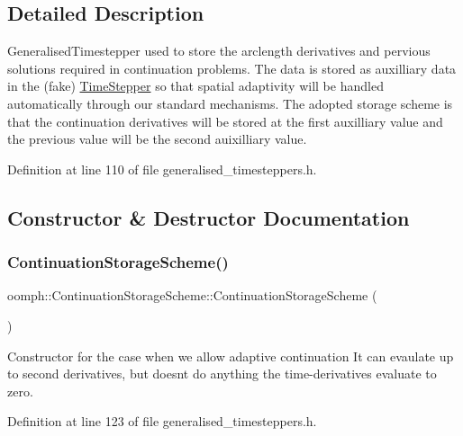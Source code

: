 \subsection{Detailed Description}
Generalised\+Timestepper used to store the arclength derivatives and pervious solutions required in continuation problems. The data is stored as auxilliary data in the (fake) \hyperlink{classoomph_1_1TimeStepper}{Time\+Stepper} so that spatial adaptivity will be handled automatically through our standard mechanisms. The adopted storage scheme is that the continuation derivatives will be stored at the first auxilliary value and the previous value will be the second auixilliary value. 

Definition at line 110 of file generalised\+\_\+timesteppers.\+h.



\subsection{Constructor \& Destructor Documentation}
\mbox{\label{classoomph_1_1ContinuationStorageScheme_afc4105a9e848ef6ea1320611d9d65c9b}} 
\subsubsection{\texorpdfstring{Continuation\+Storage\+Scheme()}{ContinuationStorageScheme()}\hspace{0.1cm}{\footnotesize\ttfamily [1/2]}}
{\footnotesize\ttfamily oomph\+::\+Continuation\+Storage\+Scheme\+::\+Continuation\+Storage\+Scheme (\begin{DoxyParamCaption}{ }\end{DoxyParamCaption})\hspace{0.3cm}{\ttfamily [inline]}}

Constructor for the case when we allow adaptive continuation It can evaulate up to second derivatives, but doesn\textquotesingle{}t do anything the time-\/derivatives evaluate to zero. 

Definition at line 123 of file generalised\+\_\+timesteppers.\+h.



